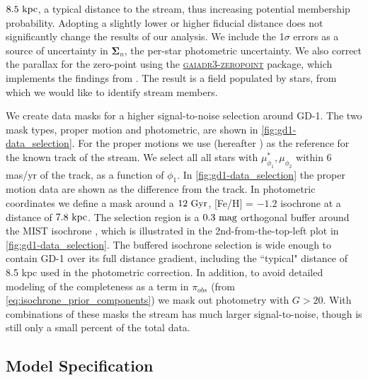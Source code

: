 \documentclass[twocolumn, linenumbers]{aastex631}
\newcommand{\code}[1]{\textsc{#1}}
\newcommand{\stream}[1]{#1}
\newcommand{\mbs}[1]{\boldsymbol{#1}}
\newcommand{\mcal}[1]{\mathcal{#1}}
\newcommand{\prior}{\mcal{\pi}}
\begin{document}
        $8.5 \ \rm{kpc}$, a typical distance to the stream, thus increasing
        potential membership probability. Adopting a slightly lower or higher
        fiducial distance does not significantly change the results of our
        analysis. We include the 1$\sigma$ errors as a source of uncertainty in
        $\mbs{\Sigma}_n$, the per-star photometric uncertainty.  We also correct
        the parallax for the zero-point using the
        \href{https://pypi.org/project/gaiadr3-zeropoint/}{\code{gaiadr3-zeropoint}}
        package, which implements the findings from \cite{Lindegren+2021}.  The
        result is a field populated by 
        stars, from which we would like to identify stream members.

        We create data masks for a higher signal-to-noise selection around
        \stream{GD-1}.  The two mask types, proper motion and photometric, are
        shown in \autoref{fig:gd1-data_selection}. For the proper motions we use
        \citet{Ibata+2021} (hereafter ) as the reference
        for the known track of the stream. We select all all stars with
        $\mu_{\phi_1}^*, \mu_{\phi_2}$ within 6 mas/yr of the track, as a
        function of $\phi_1$. In \autoref{fig:gd1-data_selection} the proper
        motion data are shown as the difference from the 
        track.  In photometric coordinates we define a mask around a $12 \
        \rm{Gyr}$, [Fe/H] = $-1.2$ isochrone at a distance of $7.8 \ \rm{kpc}$.
        The selection region is a $0.3 \ \rm{mag}$ orthogonal buffer around the
        MIST isochrone \citep[using][]{brutus}, which is illustrated in the
        2nd-from-the-top-left plot in \autoref{fig:gd1-data_selection}. The
        buffered isochrone selection is wide enough to contain \stream{GD-1}
        over its full distance gradient, including the ``typical" distance of
        8.5 kpc used in the photometric correction.  In addition, to avoid
        detailed modeling of the completeness as a term in $\prior_{obs}$ (from
        \autoref{eq:isochrone_prior_components}) we mask out photometry with $G
        > 20$.  With combinations of these masks the stream has much larger
        signal-to-noise, though is still only a small percent of the total data.


    \subsection{Model Specification}\label{sub:results_gd1:model}
\end{document}
